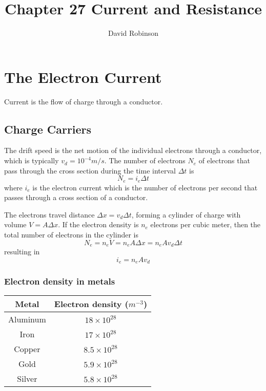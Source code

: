 \documentclass{article}
\title{Chapter 27 Current and Resistance}
\author{David Robinson}
\date{}
\begin{document}
\maketitle

\section*{The Electron Current}
Current is the flow of charge through a conductor.

\subsection*{Charge Carriers}
The drift speed is the net motion of the individual electrons through a conductor, which is
typically $v_d = 10^{-4} m/s$. The number of electrons $N_e$ of electrons that pass through the
cross section during the time interval $\Delta t$ is
\[N_e=i_e \Delta t\] where $i_e$ is the electron current which is the number of electrons per
second that passes through a cross section of a conductor.

\vspace{1em}

The electrons travel distance $\Delta x = v_d \Delta t$, forming a cylinder of charge with volume
$V = A\Delta x$. If the electron density is $n_e$ electrons per cubic meter, then the total number
of electrons in the cylinder is
\[N_e = n_e V = n_e A \Delta x = n_e A v_d \Delta t\] resulting in \[i_e = n_e Av_d\]

\subsubsection*{Electron density in metals}

\begin{center}
\begin{tabular}{|c c|} 
    \hline
    Metal & Electron density ($m^{-3}$) \\ [0.5ex]
    \hline
    Aluminum & $18\times 10^{28}$ \\
    \hline
    Iron & $17\times 10^{28}$ \\
    \hline
    Copper & $8.5\times 10^{28}$ \\
    \hline
    Gold & $5.9\times 10^{28}$ \\
    \hline
    Silver & $5.8\times 10^{28}$ \\
    \hline
\end{tabular}
\end{center}
\end{document}
